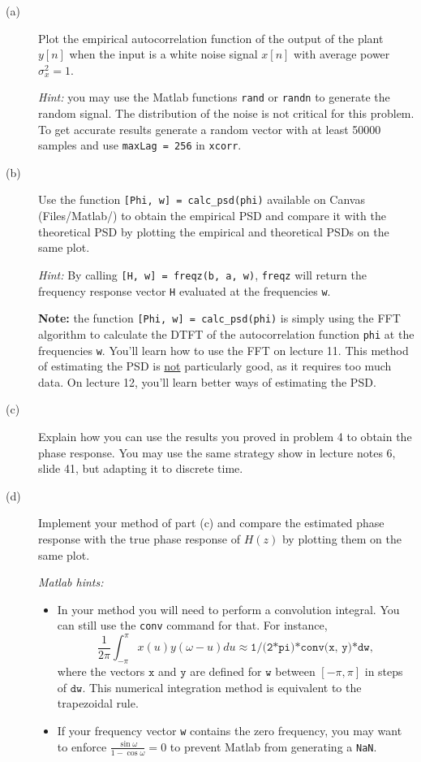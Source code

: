\documentclass[12pt]{report}
\begin{document}
\begin{description}
	\item[(a)] Plot the empirical autocorrelation function of the output of the plant $y[n]$ when the input is a white noise signal $x[n]$ with average power $\sigma_x^2 = 1$. 
	
	\textit{Hint:} you may use the Matlab functions \texttt{rand} or \texttt{randn} to generate the random signal. The distribution of the noise is not critical for this problem. To get accurate results generate a random vector with at least 50000 samples and use \texttt{maxLag = 256} in \texttt{xcorr}.
	
	\item[(b)] Use the function \texttt{[Phi, w] = calc\_psd(phi)} available on Canvas (Files/Matlab/) to obtain the empirical PSD and compare it with the theoretical PSD by plotting the empirical and theoretical PSDs on the same plot.
	
	\textit{Hint:} By calling \texttt{[H, w] = freqz(b, a, w)}, \texttt{freqz} will return the frequency response vector \texttt{H} evaluated at the frequencies \texttt{w}.
	
	\textbf{Note:} the function \texttt{[Phi, w] = calc\_psd(phi)} is simply using the FFT algorithm to calculate the DTFT of the autocorrelation function \texttt{phi} at the frequencies \texttt{w}. You'll learn how to use the FFT on lecture 11. This method of estimating the PSD is \underline{not} particularly good, as it requires too much data. On lecture 12, you'll  learn better ways of estimating the PSD.
		
	\item[(c)] Explain how you can use the results you proved in problem 4 to obtain the phase response. You may use the same strategy show in lecture notes 6, slide 41, but adapting it to discrete time.
	
	\item[(d)] Implement your method of part (c) and compare the estimated phase response with the true phase response of $H(z)$ by plotting them on the same plot. 
		
	\textit{Matlab hints:}
	\begin{itemize}
		\item In your method you will need to perform a convolution integral. You can still use the \texttt{conv} command for that. For instance,
		\begin{equation}
		\frac{1}{2\pi}\int_{-\pi}^{\pi}x(u)y(\omega-u)du \approx \texttt{1/(2*pi)*conv(x, y)*dw},
		\end{equation}
		where the vectors $\texttt{x}$ and  $\texttt{y}$ are defined for $\texttt{w}$ between $[-\pi, \pi]$ in steps of $\texttt{dw}$. This numerical integration method is equivalent to the trapezoidal rule.
		\item If your frequency vector \texttt{w} contains the zero frequency, you may want to enforce $\frac{\sin\omega}{1-\cos\omega}  = 0$ to prevent Matlab from generating a \texttt{NaN}.
	\end{itemize}
		

\end{description}
\end{document}
